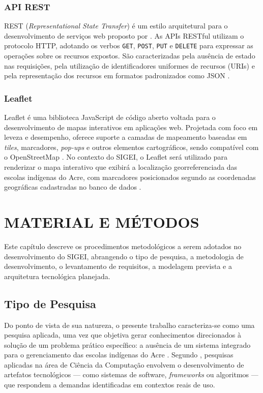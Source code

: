 \documentclass[12pt,a4paper,oneside]{abntspiifac}
\begin{document}
\subsection{API REST}

REST (\textit{Representational State Transfer}) é um estilo arquitetural para o desenvolvimento de serviços web proposto por . As APIs RESTful utilizam o protocolo HTTP, adotando os verbos \texttt{GET}, \texttt{POST}, \texttt{PUT} e \texttt{DELETE} para expressar as operações sobre os recursos expostos. São caracterizadas pela ausência de estado nas requisições, pela utilização de identificadores uniformes de recursos (URIs) e pela representação dos recursos em formatos padronizados como JSON \cite{richardson2013}.

\subsection{Leaflet}

Leaflet é uma biblioteca JavaScript de código aberto voltada para o desenvolvimento de mapas interativos em aplicações web. Projetada com foco em leveza e desempenho, oferece suporte a camadas de mapeamento baseadas em \textit{tiles}, marcadores, \textit{pop-ups} e outros elementos cartográficos, sendo compatível com o OpenStreetMap \cite{leaflet2023}. No contexto do SIGEI, o Leaflet será utilizado para renderizar o mapa interativo que exibirá a localização georreferenciada das escolas indígenas do Acre, com marcadores posicionados segundo as coordenadas geográficas cadastradas no banco de dados \cite{muehlenhaus2014}.



\chapter{MATERIAL E MÉTODOS}
\label{cap:metodos}

Este capítulo descreve os procedimentos metodológicos a serem adotados no desenvolvimento do SIGEI, abrangendo o tipo de pesquisa, a metodologia de desenvolvimento, o levantamento de requisitos, a modelagem prevista e a arquitetura tecnológica planejada.

\section{Tipo de Pesquisa}

Do ponto de vista de sua natureza, o presente trabalho caracteriza-se como uma pesquisa aplicada, uma vez que objetiva gerar conhecimentos direcionados à solução de um problema prático específico: a ausência de um sistema integrado para o gerenciamento das escolas indígenas do Acre \cite{gil2008}. Segundo , pesquisas aplicadas na área de Ciência da Computação envolvem o desenvolvimento de artefatos tecnológicos — como sistemas de software, \textit{frameworks} ou algoritmos — que respondem a demandas identificadas em contextos reais de uso.
\end{document}
